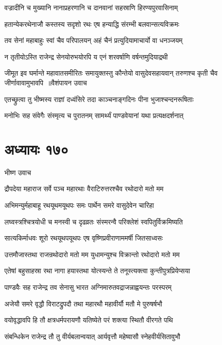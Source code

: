 \twolineshloka
{वज्रादीनि च मुख्यानि नानाप्रहरणानि च}
{दानवानां सहस्राणि हिरण्यपुरवासिनाम्}


\twolineshloka
{हतान्येकरथेनाजौ कस्तस्य सदृशो रथः}
{एष हन्याद्धि संरम्भी बलवान्सत्यविक्रमः}


\twolineshloka
{तव सेनां महाबाहुः स्वां चैव परिपालयन्}
{अहं चैनं प्रत्युदियामाचार्यो वा धनञ्जयम्}


\twolineshloka
{न तृतीयोऽस्ति राजेन्द्र सेनयोरुभयोरपि}
{य एनं शरवर्षाणि वर्षन्तमुदियाद्रथी}


\fourlineindentedshloka
{जीमूत इव घर्मान्ते महावातसमीरितः}
{समायुक्तस्तु कौन्तेयो वासुदेवसहायवान्}
{तरुणश्च कृती चैव जीर्णावावामुभावपि ॥वैशंपायन उवाच}
{}


\twolineshloka
{एतच्छ्रुत्वा तु भीष्मस्य राज्ञां दध्वंसिरे तदा}
{काञ्चनाङ्गदिनः पीना भुजाश्चन्दनरूषिताः}


\twolineshloka
{मनोभिः सह संवेगैः संस्मृत्य च पुरातनम्}
{सामर्थ्यं पाण्डवेयानां यथा प्रत्यक्षदर्शनात्}


\chapter{अध्यायः १७०}
\twolineshloka
{भीष्ण उवाच}
{}


\twolineshloka
{द्रौपदेया महाराज सर्वे पञ्च महारथाः}
{वैराटिरुत्तरश्चैव रथोदारो मतो मम}


\twolineshloka
{अभिमन्युर्महाबाहू रथयूथमयूथपः}
{समः पार्थेन समरे वासुदेवेन चारिहा}


\twolineshloka
{लघ्वस्त्रश्चित्रयोधी च मनस्वी च दृढव्रतः}
{संस्मरन्वै परिक्लेशं स्वपितुर्विक्रमिष्यति}


\twolineshloka
{सात्यकिर्माधवः शूरो रथयूथपयूथपः}
{एष वृष्णिप्रवीराणाममर्षी जितसाध्वसः}


\twolineshloka
{उत्तमौजास्तथा राजन्रथोदारो मतो मम}
{युधामन्युश्च विक्रान्तो रथोदारो मतो मम}


\twolineshloka
{एतेषां बहुसाहस्रा रथा नागा हयास्तथा}
{योत्स्यन्ते ते तनूस्त्यक्त्वा कुन्तीपुत्रप्रियेप्सया}


\twolineshloka
{पाण्डवैः सह राजेन्द्र तव सेनासु भारत}
{अग्निमारुतवद्राजन्नाह्वयन्तः परस्परम्}


\twolineshloka
{अजेयौ समरे वृद्धौ विराटद्रुपदौ तथा}
{महारथौ महावीर्यौ मतौ मे पुरुषर्षभौ}


\twolineshloka
{वयोवृद्धावपि हि तौ क्षत्रधर्मपरायणौ}
{यतिष्येते परं शक्त्या स्थितौ वीरगते पथि}


\twolineshloka
{संबन्धिकेन राजेन्द्र तौ तु वीर्यबलान्वयात्}
{आर्यवृत्तौ महेष्वासौ स्नेहवीर्यसितावुभौ}


